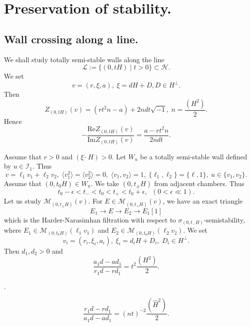 \documentclass[10pt]{amsart}
\def\cal{\mathcal}
\newenvironment{NB}{
\color{red}{\bf NB}. \footnotesize 
}{}
\numberwithin{equation}{section}
\theoremstyle{plain}
\theoremstyle{definition}
\theoremstyle{remark}
\begin{document}
\section{Preservation of stability.}\label{sect:Preserve}

\subsection{Wall crossing along a line.}\label{subsect:line}

We shall study totally semi-stable walls along the line
\begin{equation}\label{eq:line}
{\cal L}:=\{(0,tH) \mid t>0 \} \subset {\cal H}.
\end{equation}
We set 
$$
v=(r,\xi,a),\; \xi=dH+D, D \in H^\perp.
$$
Then 
\begin{equation}
Z_{(0,tH)}(v)=(rt^2n-a)+2ndt \sqrt{-1},\; n=\frac{(H^2)}{2}.
\end{equation}
Hence 
\begin{equation}\label{eq:mu}
-\frac{\mathrm{Re}Z_{(0,tH)}(v)}{\mathrm{Im}Z_{(0,tH)}(v)}=
\frac{a-rt^2 n}{2ndt}.
\end{equation}

Assume that $r>0$ and $(\xi \cdot H)>0$.
Let $W_u$ be a totally semi-stable wall defined by $u \in {\cal I}_1$.
Thus 
\begin{equation}\label{eq:u}
v=\ell_1 v_1+\ell_2 v_2, \; \langle v_1^2 \rangle=\langle v_2^2 \rangle=0,\; 
\langle v_1,v_2 \rangle=1,\; \{ \ell_1,\ell_2 \}=\{ \ell,1 \},\; u \in \{v_1,v_2 \}. 
\end{equation}
Assume that $(0,t_0 H) \in W_u$.
We take $(0,t_\pm H)$ from adjacent chambers. Thus
\begin{equation}
t_0-\epsilon<t_-<t_0 <t_+ <t_0+\epsilon, \;\;(0<\epsilon \ll 1).
\end{equation} 
Let us study ${\cal M}_{(0,t_\pm H)}(v)$.
For $E \in {\cal M}_{(0,t_+ H)}(v)$, we have an exact triangle
\begin{equation}\label{eq:HNF-}
E_1 \to E \to E_2 \to E_1[1]
\end{equation}
which is the Harder-Narasimhan filtration with respect to
$\sigma_{(0,t_- H)}$-semistability,
where
$E_1 \in {\cal M}_{(0,t_0 H)}(\ell_1 v_1)$ and
$E_2 \in {\cal M}_{(0,t_0 H)}(\ell_2 v_2)$.
We set 
$$
v_i=(r_i,\xi_i,a_i),\;\xi_i=d_i H+D_i,\; D_i \in H^\perp.
$$
Then $d_1,d_2>0$ and
$$
\frac{a_1 d-ad_1}{r_1 d-rd_1}=t^2 \frac{(H^2)}{2}.
$$

\begin{NB}
$$
\frac{r_1 d-rd_1}{a_1 d-ad_1}=(nt)^{-2} \frac{(\widehat{H}^2)}{2}.
$$
\end{NB}
\end{document}
